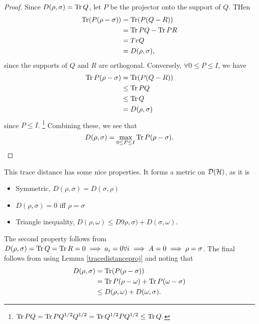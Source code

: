 \begin{proof}
Since $D(\rho,\sigma)=\operatorname{Tr} Q$, let $P$ be the projector onto the support of $Q$. THen
\begin{align*}
    \operatorname{Tr}(P(\rho-\sigma))&=\operatorname{Tr}(P(Q-R))\\
        &=\operatorname{Tr} PQ - \operatorname{Tr} PR\\
        &= Tr Q\\
        &= D(\rho,\sigma),
\end{align*}
since the supports of $Q$ and $R$ are orthogonal.
Conversely, $\forall 0\leq P \leq I$, we have
\begin{align}
    \operatorname{Tr} P(\rho-\sigma) &= \operatorname{Tr}(P(Q-R))\\
        &\leq \operatorname{Tr} PQ\\
        &\leq \operatorname{Tr} Q\\
        &= D(\rho,\sigma)
\end{align}
since $P\leq I$.%
    \footnote{$\operatorname{Tr} PQ = \operatorname{Tr} P Q^{1/2} Q^{1/2}=\operatorname{Tr} Q^{1/2} P Q^{1/2} \leq \operatorname{Tr} Q.$}
Combining these, we see that
\begin{equation*}
    D(\rho,\sigma) = \max_{0\leq P \leq I} \operatorname{Tr} P(\rho-\sigma).
\end{equation*}
\end{proof}
This trace distance has some nice properties. It forms a metric on $\mathcal{D}(\mathcal H)$, as it is
\begin{itemize}
    \item Symmetric, $D(\rho,\sigma)=D(\sigma,\rho)$
    \item $D(\rho,\sigma)=0$ iff $\rho=\sigma$
    \item Triangle inequality, $D(\rho,\omega) \leq D9\rho,\sigma)+D(\sigma,\omega)$.
\end{itemize}
The second property follows from $D(\rho,\sigma)=\operatorname{Tr} Q =\operatorname{Tr} R=0\implies a_i=0\forall i \implies A=0 \implies \rho=\sigma$. The final follows from using Lemma \ref{tracedistanceproj} and noting that
\begin{align*}
    D(\rho,\sigma) &= \operatorname{Tr}(P(\rho-\sigma))\\
        &= \operatorname{Tr} P(\rho-\omega)+\operatorname{Tr} P(\omega-\sigma)\\
        &\leq D(\rho,\omega) +D(\omega,\sigma).
\end{align*}

